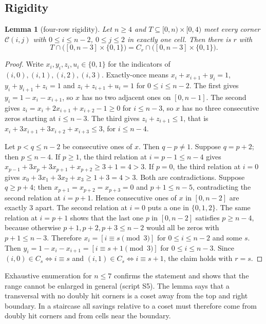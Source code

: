 \documentclass[11pt]{amsart}
\newtheorem{lemma}[theorem]{Lemma}
\theoremstyle{definition}
\newcommand{\Cor}{\mathcal{C}}
\begin{document}
\subsection{Rigidity}
\begin{lemma}[four-row rigidity]\label{lem:rigid}
Let $n\ge4$ and $T\subseteq[0,n)\times[0,4)$ meet every corner $\Cor(i,j)$ with $0\le i\le n-2$, $0\le j\le2$ in exactly one cell. Then there is $r$ with
\[
T\cap\bigl([0,n-3]\times\{0,1\}\bigr)=C_r\cap\bigl([0,n-3]\times\{0,1\}\bigr).
\]
\end{lemma}

\begin{proof}
Write $x_i,y_i,z_i,u_i\in\{0,1\}$ for the indicators of $(i,0),(i,1),(i,2),(i,3)$. Exactly-once means $x_i+x_{i+1}+y_i=1$, $y_i+y_{i+1}+z_i=1$ and $z_i+z_{i+1}+u_i=1$ for $0\le i\le n-2$. The first gives $y_i=1-x_i-x_{i+1}$, so $x$ has no two adjacent ones on $[0,n-1]$. The second gives $z_i=x_i+2x_{i+1}+x_{i+2}-1\ge0$ for $i\le n-3$, so $x$ has no three consecutive zeros starting at $i\le n-3$. The third gives $z_i+z_{i+1}\le1$, that is $x_i+3x_{i+1}+3x_{i+2}+x_{i+3}\le3$, for $i\le n-4$.

Let $p<q\le n-2$ be consecutive ones of $x$. Then $q-p\ne1$. Suppose $q=p+2$; then $p\le n-4$. If $p\ge1$, the third relation at $i=p-1\le n-4$ gives $x_{p-1}+3x_p+3x_{p+1}+x_{p+2}\ge3+1=4>3$. If $p=0$, the third relation at $i=0$ gives $x_0+3x_1+3x_2+x_3\ge1+3=4>3$. Both are contradictions. Suppose $q\ge p+4$; then $x_{p+1}=x_{p+2}=x_{p+3}=0$ and $p+1\le n-5$, contradicting the second relation at $i=p+1$. Hence consecutive ones of $x$ in $[0,n-2]$ are exactly $3$ apart. The second relation at $i=0$ puts a one in $\{0,1,2\}$. The same relation at $i=p+1$ shows that the last one $p$ in $[0,n-2]$ satisfies $p\ge n-4$, because otherwise $p+1,p+2,p+3\le n-2$ would all be zeros with $p+1\le n-3$. Therefore $x_i=[i\equiv s\pmod 3]$ for $0\le i\le n-2$ and some $s$. Then $y_i=1-x_i-x_{i+1}=[i\equiv s+1\pmod3]$ for $0\le i\le n-3$. Since $(i,0)\in C_s\iff i\equiv s$ and $(i,1)\in C_s\iff i\equiv s+1$, the claim holds with $r=s$.
\end{proof}

Exhaustive enumeration for $n\le7$ confirms the statement and shows that the range cannot be enlarged in general (script S5). The lemma says that a transversal with no doubly hit corners is a coset away from the top and right boundary. In a staircase all savings relative to a coset must therefore come from doubly hit corners and from cells near the boundary.
\end{document}

